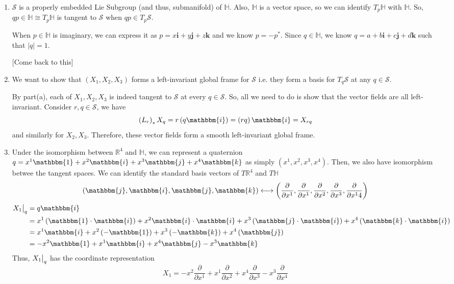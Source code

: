 \documentclass{article}
\newcommand{\R}{\mathbb{R}}
\newcommand{\restr}[2]{{%
  \left.\kern-\nulldelimiterspace %
  #1 %
  \vphantom{\big|} %
  \right|_{#2} %
  }}
\begin{document}
\begin{enumerate}[label=(\alph*)]
  \item $\mathcal{S}$ is a properly embedded Lie Subgroup (and thus, submanifold) of $\mathbb{H}$. Also, $\mathbb{H}$ is a vector space, so we can identify $T_p \mathbb{H}$ with $\mathbb{H}$. So, $qp \in \mathbb{H} \cong  T_p \mathbb{H}$ is tangent to $\mathcal{S}$ when $qp \in T_p \mathcal{S}$.
  

  When $p \in \mathbb{H}$ is imaginary, we can express it as $p = x \mathbf{i} + y \mathbf{j} + z \mathbf{k}$ and we know $p = -p^*$. Since $q \in \mathbb{H}$, we know $q = a + b \mathbf{i} + c \mathbf{j} + d \mathbf{k}$ such that $|q| = 1$.

  [Come back to this]

  \vskip 1cm
  \item We want to show that $\left(X_1, X_2, X_3\right)$ forms a left-invariant global frame for $\mathcal{S}$ i.e. they form a basis for $T_q \mathcal{S}$ at any $q \in \mathcal{S}$. 
  
  \vskip 0.5cm
  By part(a), each of $X_1, X_2, X_3$ is indeed tangent to $\mathcal{S}$ at every $q \in \mathcal{S}$. So, all we need to do is show that the vector fields are all left-invariant. Consider $r, q \in \mathcal{S}$, we have 
  \[ \left(L_r\right)_* X_q = r\left(q \mathbbm{i}\right) = \left(rq\right) \mathbbm{i} = X_{rq} \]
  and similarly for $X_2, X_3$. Therefore, these vector fields form a smooth left-invariant global frame.

  \vskip 1cm
  \item Under the isomorphism between $\R^4$ and $\mathbb{H}$, we can represent a quaternion $q = x^1 \mathbbm{1} + x^2 \mathbbm{i} + x^3 \mathbbm{j} + x^4 \mathbbm{k}$ as simply $\left( x^1, x^2, x^3, x^4 \right).$ Then, we also have isomorphism betwee the tangent spaces. We can identify the standard basis vectors of $T\R^4$ and $T \mathbb{H}$
  \[ \left(\mathbbm{j}, \mathbbm{i}, \mathbbm{j}, \mathbbm{k}\right) \longleftrightarrow \left( \frac{\partial}{\partial x^1}, \frac{\partial}{\partial x^1}, \frac{\partial}{\partial x^2}, \frac{\partial}{\partial x^3}, \frac{\partial}{\partial x^14} \right) \]
  \begin{align*}
    \restr{X_1}{q} &= q\mathbbm{i} \\
    &= x^1 \left(\mathbbm{1} \cdot \mathbbm{i}\right) + x^2 \mathbbm{i} \cdot \mathbbm{i} + x^3 \left(\mathbbm{j} \cdot \mathbbm{i}\right) + x^4 \left(\mathbbm{k} \cdot \mathbbm{i}\right) \\
    &= x^1 \mathbbm{i} + x^2 \left(-\mathbbm{1}\right) + x^3 \left(-\mathbbm{k}\right) + x^4 \left(\mathbbm{j}\right) \\
    &= -x^2 \mathbbm{1} + x^1\mathbbm{i} + x^4\mathbbm{j} - x^3\mathbbm{k}
  \end{align*}
  Thus, $\restr{X_1}{q}$ has the coordinate representation 
  \[ \boxed{X_1 = -x^2 \frac{\partial}{\partial x^1} + x^1 \frac{\partial}{\partial x^2} + x^4 \frac{\partial}{\partial x^3} - x^3 \frac{\partial}{\partial x^4}}  \] 


\end{enumerate}
\end{document}
